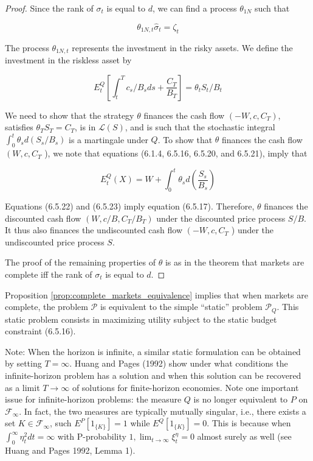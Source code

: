 \documentclass[\topdir/lecture\_notes.tex]{subfiles}
\begin{document}
\begin{proof}
Since the rank of \(\sigma_{t}\) is equal to \(d\), we can find a process \(\theta_{1 N}\) such that

\begin{equation}
\theta_{1 N, t} \hat{\sigma}_{t}=\zeta_{t} \label{eq:6.5.21}
\end{equation}

The process \(\theta_{1 N, t}\) represents the investment in the risky assets. We define the investment in the riskless asset by

\begin{equation}
E_{t}^{Q}\left[\int_{t}^{T} c_{s}/B_{s} d s+\frac{C_{T}}{B_{T}}\right]=\theta_{t} S_{t}/B_{t} \label{eq:6.5.22}
\end{equation}

We need to show that the strategy \(\theta\) finances the cash flow \(\left(-W, c, C_{T}\right)\), satisfies \(\theta_{T} S_{T}=C_{T}\), is in \(\mathcal{L}(S)\), and is such that the stochastic integral \(\int_{0}^{t} \theta_{s} d\left(S_{s} / B_{s}\right)\) is a martingale under \(Q\). To show that \(\theta\) finances the cash flow \(\left(W, c, C_{T}\right.\) ), we note that equations (6.1.4, 6.5.16, 6.5.20, and 6.5.21), imply that

\begin{equation}
E_{t}^{Q}(X)=W+\int_{0}^{t} \theta_{s} d\left(\frac{S_{s}}{B_{s}}\right) \label{eq:6.5.23}
\end{equation}

Equations (6.5.22) and (6.5.23) imply equation (6.5.17). Therefore, \(\theta\) finances the discounted cash flow \(\left(W, c / B, C_{T} / B_{T}\right)\) under the discounted price process \(S / B\). It thus also finances the undiscounted cash flow \(\left(-W, c, C_{T}\right.\) ) under the undiscounted price process \(S\).

The proof of the remaining properties of \(\theta\) is as in the theorem that markets are complete iff the rank of \(\sigma_{t}\) is equal to \(d\).

\end{proof}

Proposition \ref{prop:complete_markets_equivalence} implies that when markets are complete, the problem \(\mathcal{P}\) is equivalent to the simple ``static'' problem \(\mathcal{P}_{Q}\). This static problem consists in maximizing utility subject to the static budget constraint (6.5.16).

Note: When the horizon is infinite, a similar static formulation can be obtained by setting \(T=\infty\). Huang and Pages (1992) show under what conditions the infinite-horizon problem has a solution and when this solution can be recovered as a limit \(T \rightarrow \infty\) of solutions for finite-horizon economies. Note one important issue for infinite-horizon problems: the measure \(Q\) is no longer equivalent to \(P\) on \(\mathcal{F}_{\infty}\). In fact, the two measures are typically mutually singular, i.e., there exists a set \(K \in \mathcal{F}_{\infty}\), such \(E^{P}\left[1_{\{K\}}\right]=1\) while \(E^{Q}\left[1_{\{K\}}\right]=0\). This is because when \(\int_{0}^{\infty} \eta_{t}^{2} d t=\infty\) with P-probability \(1, \lim _{t \rightarrow \infty} \xi_{t}^{\eta}=0\) almost surely as well (see Huang and Pages 1992, Lemma 1).
\end{document}
